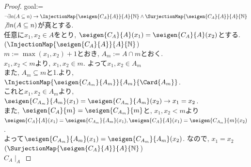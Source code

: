 \begin{proof}
 goal:= $\lnot \exists n (A \subseteq n) \rightarrow \InjectionMap{\seigen{C_A}{A}}{A}{\mathbb{N}} \land \SurjectionMap{\seigen{C_A}{A}}{A}{\mathbb{N}}$\\

 $\not \exists n (A \subseteq n)$が真とする.\\
 任意に$x_1, x_2 \in A$をとり,
 $\seigen {C_A}{A}(x_1) = \seigen{C_A}{A}(x_2)$とする.\\
 
 $(\InjectionMap{\seigen{C_A}{A}}{A}{\mathbb{N}}$)\\
 $m:= \operatorname{max}(x_1, x_2) + 1$とおき,
 $A_m := A \cap m$とおく.\\
 $x_1, x_2 < m$より,
 $x_1, x_2 \in m$.
 よって$x_1, x_2 \in A_m$\\
 また,
 $A_m \subseteq m$と1.より,
$\InjectionMap{\seigen {C_{A_m}}{A_m}}{A_m}{\Card{A_m}}$.\\
 これと$x_1, x_2 \in A_m$より,
 $\seigen{C_{A_m}}{A_m}(x_1) = \seigen{C_{A_m}}{A_m}(x_2) \rightarrow x_1 = x_2$.\\
 また,
 $\seigen {C_A}{m} = \seigen {C_{A_m}}{m}$と,
 $x_1, x_2 < m$より\\
 $\seigen {C_A}{A}(x_1) = \seigen {C_{A_m}}{A_m}(x_1), \seigen {C_A}{A}(x_1) = \seigen {C_{A_m}}{m}(x_2)$.\\
 よって$\seigen{C_{A_m}}{A_m}(x_1) = \seigen{C_{A_m}}{A_m}(x_2)$.
 なので,
 $x_1 = x_2$\\
 
 $(\SurjectionMap{\seigen{C_A}{A}}{A}{\mathbb{N}}$)\\

$C_A\mid_A$

\end{proof}
